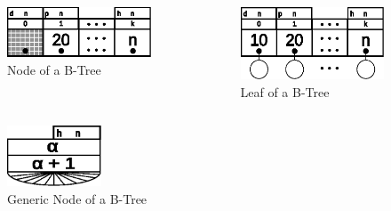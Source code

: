 \documentclass{beamer}
\begin{document}
\begin{frame}
    \framebreak{}
    \begin{columns}
        \begin{column}{0.35\textwidth}
                \begin{figure}
                    \includegraphics[width=\textwidth]{resources/made/single_node.eps}
                    \caption[]{Node of a B-Tree}
                \end{figure}
        \end{column}
        \begin{column}{0.35\textwidth}
                \begin{figure}
                    \includegraphics[width=\textwidth]{resources/made/single_leaf.eps}
                    \caption[]{Leaf of a B-Tree}
                \end{figure}
        \end{column}
    \end{columns}
    \begin{figure}
        \includegraphics[width=0.25\textwidth]{resources/made/single_node_generic.eps}
        \caption[]{Generic Node of a B-Tree}
    \end{figure}
\end{frame}
\end{document}
